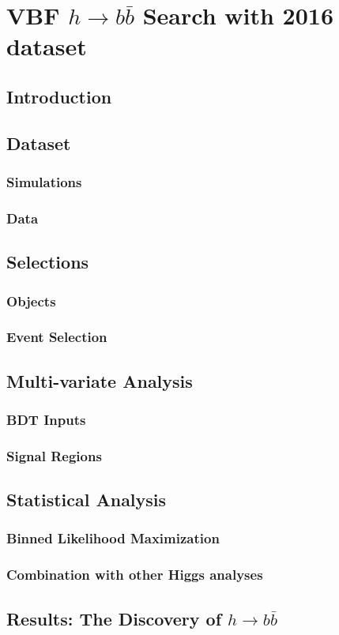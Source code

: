 \chapter{VBF $h\rightarrow b\bar{b}$ Search with 2016 dataset}
\section{Introduction}

\section{Dataset}
\subsection{Simulations}
\subsection{Data}
\section{Selections}
\subsection{Objects}
\subsection{Event Selection}
\section{Multi-variate Analysis}
\subsection{BDT Inputs}
\subsection{Signal Regions}
\section{Statistical Analysis}
\subsection{Binned Likelihood Maximization}
\subsection{Combination with other Higgs analyses}
\section{Results: The Discovery of $h\rightarrow b\bar{b}$}

